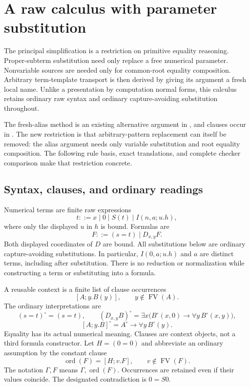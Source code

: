 
\section{A raw calculus with parameter substitution}
\label{sec:rp-spec}

The principal simplification is a restriction on primitive equality
reasoning.  Proper-subterm substitution need only replace a free numerical
parameter.  Nonvariable sources are needed only for common-root equality
composition.  Arbitrary term-template transport is then derived by giving
its argument a fresh local name.  Unlike a presentation by computation
normal forms, this calculus retains ordinary raw syntax and ordinary
capture-avoiding substitution throughout.

The fresh-alias method is an existing alternative argument in
\cite{templatefree}, and clauses occur in \cite{rawclausal}.  The new
restriction is that arbitrary-pattern replacement can itself be removed:
the alias argument needs only variable substitution and root equality
composition.  The following rule basis, exact translations, and complete
checker comparison make that restriction concrete.

\subsection{Syntax, clauses, and ordinary readings}

Numerical terms are finite raw expressions
\[
 t::=x\mid0\mid S(t)\mid I(n,a;u.h),
\]
where only the displayed $u$ in $h$ is bound.  Formulas are
\[
 F::=(s=t)\mid D_{x,y}F.
\]
Both displayed coordinates of $D$ are bound.  All substitutions below
are ordinary capture-avoiding substitutions.  In particular,
$I(0,a;u.h)$ and $a$ are distinct terms, including after substitution.
There is no reduction or normalization while constructing a term or
substituting into a formula.

A reusable context is a finite list of clause occurrences
\[
 [A;y.B(y)],\qquad y\notin\operatorname{FV}(A).
\]
The ordinary interpretations are
\[
 (s=t)^\circ=(s=t),\qquad
 (D_{x,y}B)^\circ
   =\exists x\bigl(B^\circ(x,0)\to\forall y\,B^\circ(x,y)\bigr),
\]
\[
 [A;y.B]^\circ=A^\circ\to\forall y\,B^\circ(y).
\]
Equality has its actual numerical meaning.  Clauses are context objects,
not a third formula constructor.  Let $H=(0=0)$ and abbreviate an ordinary
assumption by the constant clause
\[
 \operatorname{ord}(F)=[H;v.F],\qquad v\notin\operatorname{FV}(F).
\]
The notation $\Gamma,F$ means $\Gamma,\operatorname{ord}(F)$.
Occurrences are retained even if their values coincide.  The designated
contradiction is $0=S0$.

